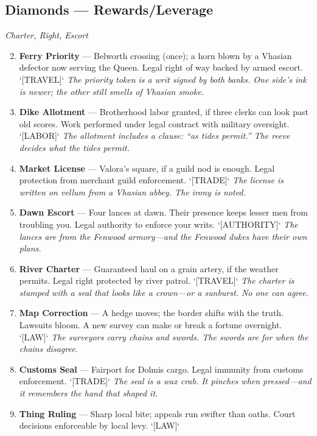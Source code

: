 \subsection{Diamonds --- Rewards/Leverage}
\label{sec:viterra-rewards}
\noindent\textit{Charter, Right, Escort}

\begin{enumerate}
\setcounter{enumi}{1}
\item \textbf{Ferry Priority} --- Belworth crossing (once); a horn blown by a Vhasian defector now serving the Queen. Legal right of way backed by armed escort. `[TRAVEL]`
  \hfill \textit{The priority token is a writ signed by both banks. One side's ink is newer; the other still smells of Vhasian smoke.}
\item \textbf{Dike Allotment} --- Brotherhood labor granted, if three clerks can look past old scores. Work performed under legal contract with military oversight. `[LABOR]`
  \hfill \textit{The allotment includes a clause: ``as tides permit.'' The reeve decides what the tides permit.}
\item \textbf{Market License} --- Valora's square, if a guild nod is enough. Legal protection from merchant guild enforcement. `[TRADE]`
  \hfill \textit{The license is written on vellum from a Vhasian abbey. The irony is noted.}
\item \textbf{Dawn Escort} --- Four lances at dawn. Their presence keeps lesser men from troubling you. Legal authority to enforce your writs. `[AUTHORITY]`
  \hfill \textit{The lances are from the Fenwood armory---and the Fenwood dukes have their own plans.}
\item \textbf{River Charter} --- Guaranteed haul on a grain artery, if the weather permits. Legal right protected by river patrol. `[TRAVEL]`
  \hfill \textit{The charter is stamped with a seal that looks like a crown---or a sunburst. No one can agree.}
\item \textbf{Map Correction} --- A hedge moves; the border shifts with the truth. Lawsuits bloom. A new survey can make or break a fortune overnight. `[LAW]`
  \hfill \textit{The surveyors carry chains and swords. The swords are for when the chains disagree.}
\item \textbf{Customs Seal} --- Fairport for Dolmis cargo. Legal immunity from customs enforcement. `[TRADE]`
  \hfill \textit{The seal is a wax crab. It pinches when pressed---and it remembers the hand that shaped it.}
\item \textbf{Thing Ruling} --- Sharp local bite; appeals run swifter than oaths. Court decisions enforceable by local levy. `[LAW]`

\end{enumerate}
